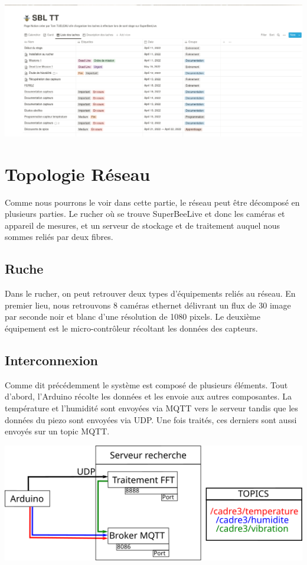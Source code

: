 \documentclass[12pt,french,a4paper]{article}
\begin{document}
\begin{center}	
\includegraphics[scale=0.35]{../img/notionlistesdestaches.png}
\label{Liste des taches}
\end{center}
\newpage

\section{Topologie Réseau}
Comme nous pourrons le voir dans cette partie, le réseau peut être décomposé en plusieurs parties. Le rucher où se trouve SuperBeeLive et donc les caméras et appareil de mesures, et un serveur de stockage et de traitement auquel nous sommes reliés par deux fibres. 
\subsection{Ruche}
Dans le rucher, on peut retrouver deux types d'équipements reliés au réseau. En premier lieu, nous retrouvons 8 caméras ethernet délivrant un flux de 30 image par seconde noir et blanc d'une résolution de 1080 pixels. Le deuxième équipement est le micro-contrôleur récoltant les données des capteurs.  
\subsection{Interconnexion}
Comme dit précédemment le système est composé de plusieurs éléments. Tout d'abord, l'Arduino récolte les données et les envoie aux autres composantes. La température et l'humidité sont envoyées via MQTT vers le serveur tandis que les données du piezo sont envoyées via UDP. Une fois traités, ces derniers sont aussi envoyés sur un topic MQTT.

\begin{center}
    \includegraphics[scale=1]{../img/schemaNet.png}
    \label{SN}
\end{center}
\end{document}
